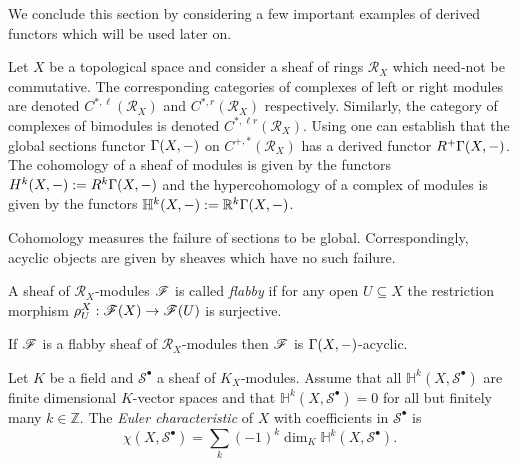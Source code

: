 We conclude this section by considering a few important examples of derived functors which will be used later on.

Let $X$ be a topological space and consider a sheaf of rings $\mathcal{R}_X$ which need-not be commutative.
The corresponding categories of complexes of left or right modules are denoted $C^{*,\ell}(\mathcal{R}_X)$ and $C^{*,r}(\mathcal{R}_X)$ respectively.
Similarly, the category of complexes of bimodules is denoted $C^{*,\ell r}(\mathcal{R}_X)$.
Using  one can establish that the global sections functor $\Gamma(X,{-})$ on $C^{+,*}(\mathcal{R}_X)$ has a derived functor $R^+\Gamma(X,{-})$.
The cohomology of a sheaf of modules is given by the functors $H^k(X,{-}) := R^k \Gamma(X,{-})$ and the hypercohomology of a complex of modules is given by the functors $\mathbb{H}^k(X,{-}):= \mathbb{R}^k\Gamma(X,{-})$.

Cohomology measures the failure of sections to be global.
Correspondingly, acyclic objects are given by sheaves which have no such failure.
\begin{definition}
 A sheaf of $\mathcal{R}_X$-modules $\mathscr{F}$ is called {\it flabby} if for any open $U\subseteq X$ the restriction morphism $\rho_U^X:\mathscr{F}(X)\to\mathscr{F}(U) $ is surjective.
\end{definition}
\begin{proposition}{\cite[Proposition 2.1.8.]{dimca2004sheaves}}
 If $\mathscr{F}$ is a flabby sheaf of $\mathcal{R}_X$-modules then $\mathscr{F}$ is $\Gamma(X,{-})$-acyclic.
\end{proposition}
\begin{definition}
  Let $K$ be a field and $\mathcal{S}^\bullet$ a sheaf of $K_X$-modules.
  Assume that all $\mathbb{H}^k(X,\mathcal{S}^\bullet)$ are finite dimensional $K$-vector spaces and that $\mathbb{H}^k(X,\mathcal{S}^\bullet) = 0$ for all but finitely many $k\in \mathbb{Z}$.
  The {\it Euler characteristic} of $X$ with coefficients in $\mathcal{S}^\bullet$ is
  $$\chi(X,\mathcal{S}^\bullet) = \sum_k (-1)^k \dim_K \mathbb{H}^k(X,\mathcal{S}^\bullet).$$
\end{definition}

